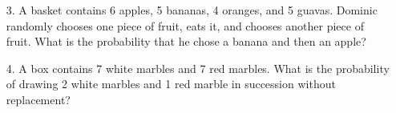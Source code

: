 \begin{enumerate}[label = \arabic*. ]


\item[3. ] A basket contains 6 apples, 5 bananas, 4 oranges, and 5 guavas. Dominic randomly chooses one piece of fruit, eats it, and chooses another piece of fruit. What is the probability that he chose a banana and then an apple?

\item[4. ] A box contains 7 white marbles and 7 red marbles. What is the probability of drawing 2 white marbles and 1 red marble in succession without replacement? 
\end{enumerate}  